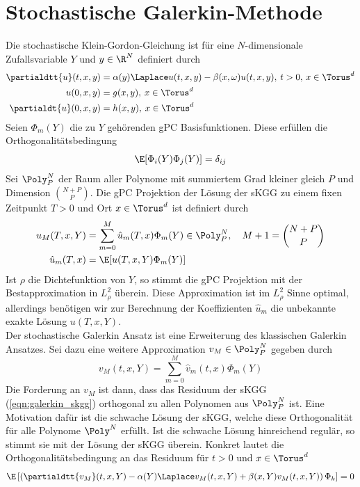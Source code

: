 
\chapter{Stochastische Galerkin-Methode}
\label{Chapter5}
Die stochastische Klein-Gordon-Gleichung ist für eine $N$-dimensionale Zufallsvariable $Y$ und $y\in\R^N$ definiert durch
\begin{align}
\label{eqn:galerkin_skgg}
\partialdtt{u}(t,x,y)&=\alpha(y) \Laplace u(t,x,y) - \beta(x,\omega)u(t,x,y), \: t>0, \, x\in \Torus^d\\
u(0,x,y)&=g(x,y), \: x\in \Torus^d\nonumber\\
\partialdt{u}(0,x,y)&=h(x,y), \: x\in \Torus^d\nonumber
\end{align}
Seien $\Phi_m(Y)$ die zu $Y$ gehörenden gPC Basisfunktionen. Diese erfüllen die Orthogonalitätsbedingung 
\[\E[\Phi_i(Y)\Phi_j(Y)]=\delta_{ij}\] 
Sei $\Poly_P^N$ der Raum aller Polynome mit summiertem Grad kleiner gleich $P$ und Dimension $\binom{N+P}{P}$. Die gPC Projektion der Lösung der sKGG zu einem fixen Zeitpunkt $T>0$ und Ort $x\in\Torus^d$ ist definiert durch
\begin{align*}
u_M(T,x,Y)&=\sum_{m=0}^M\hat{u}_m(T,x)\Phi_m(Y)\in\Poly_P^N,\quad  M+1=\binom{N+P}{P}\\
\hat{u}_m(T,x)&=\E[u(T,x,Y)\Phi_m(Y)]
\end{align*}
Ist $\rho$ die Dichtefunktion von $Y$, so stimmt die gPC Projektion mit der Bestapproximation in $L_\rho^2$ überein. Diese Approximation ist im $L_\rho^2$ Sinne optimal, allerdings benötigen wir zur Berechnung der Koeffizienten $\hat{u}_m$ die unbekannte exakte Lösung $u(T,x,Y)$.\\
Der stochastische Galerkin Ansatz ist eine Erweiterung des klassischen Galerkin Ansatzes. Sei dazu eine weitere Approximation $v_M\in\Poly_P^N$ gegeben durch
\begin{equation}
v_M(t,x,Y)=\sum_{m=0}^M\hat{v}_m(t,x)\Phi_m(Y)
\end{equation}
Die Forderung an $v_M$ ist dann, dass das Residuum der sKGG (\ref{eqn:galerkin_skgg}) orthogonal zu allen Polynomen aus $\Poly_P^N$ ist. Eine Motivation dafür ist die schwache Lösung der sKGG, welche diese Orthogonalität für alle Polynome $\Poly^N$ erfüllt. Ist die schwache Lösung hinreichend regulär, so stimmt sie mit der Lösung der sKGG überein.
Konkret lautet die Orthogonalitätsbedingung an das Residuum für $t>0$ und $x\in\Torus^d$
\begin{equation}
\label{eqn:galerkinOrtho}
\E\left[\left(\partialdtt{v_M}(t,x,Y)-\alpha(Y)\Laplace v_M(t,x,Y)+\beta(x,Y)v_M(t,x,Y)\right)\Phi_k\right]=0
\end{equation} 
